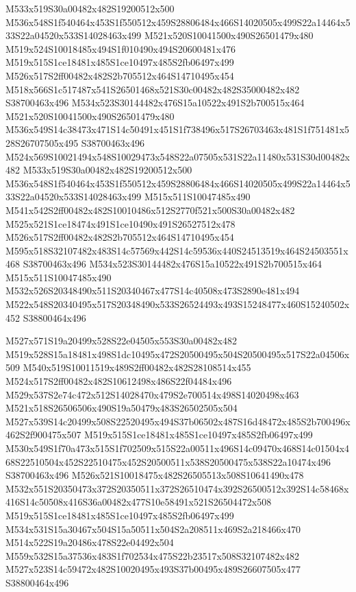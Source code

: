 \documentclass{article}
\begin{document}
\begin{multicols}{2}
M533x519S30a00482x482S19200512x500 M536x548S1f540464x453S1f550512x459S28806484x466S14020505x499S22a14464x533S22a04520x533S14028463x499 M521x520S10041500x490S26501479x480 M519x524S10018485x494S1f010490x494S20600481x476 M519x515S1ce18481x485S1ce10497x485S2fb06497x499 M526x517S2ff00482x482S2b705512x464S14710495x454 M518x566S1c517487x541S26501468x521S30c00482x482S35000482x482 S38700463x496 M534x523S30144482x476S15a10522x491S2b700515x464 M521x520S10041500x490S26501479x480 M536x549S14c38473x471S14c50491x451S1f738496x517S26703463x481S1f751481x528S26707505x495 S38700463x496 M524x569S10021494x548S10029473x548S22a07505x531S22a11480x531S30d00482x482 M533x519S30a00482x482S19200512x500 M536x548S1f540464x453S1f550512x459S28806484x466S14020505x499S22a14464x533S22a04520x533S14028463x499 M515x511S10047485x490 M541x542S2ff00482x482S10010486x512S2770f521x500S30a00482x482 M525x521S1ce18474x491S1ce10490x491S26527512x478 M526x517S2ff00482x482S2b705512x464S14710495x454 M595x518S32107482x483S14c57569x442S14c59536x440S24513519x464S24503551x468 S38700463x496 M534x523S30144482x476S15a10522x491S2b700515x464 M515x511S10047485x490 M532x526S20348490x511S20340467x477S14c40508x473S2890e481x494 M522x548S20340495x517S20348490x533S26524493x493S15248477x460S15240502x452 S38800464x496

M527x571S19a20499x528S22e04505x553S30a00482x482 M519x528S15a18481x498S1dc10495x472S20500495x504S20500495x517S22a04506x509 M540x519S10011519x489S2ff00482x482S28108514x455 M524x517S2ff00482x482S10612498x486S22f04484x496 M529x537S2e74c472x512S14028470x479S2e700514x498S14020498x463 M521x518S26506506x490S19a50479x483S26502505x504 M527x539S14c20499x508S22520495x494S37b06502x487S16d48472x485S2b700496x462S2f900475x507 M519x515S1ce18481x485S1ce10497x485S2fb06497x499 M530x549S1f70a473x515S1f702509x515S22a00511x496S14c09470x468S14c01504x468S22510504x452S22510475x452S20500511x538S20500475x538S22a10474x496 S38700463x496 M526x521S10018475x482S26505513x508S10641490x478 M532x551S20350473x372S20350511x372S26510474x392S26500512x392S14c58468x416S14c50508x416S36a00482x477S10e58491x521S26504472x508 M519x515S1ce18481x485S1ce10497x485S2fb06497x499 M534x531S15a30467x504S15a50511x504S2a208511x469S2a218466x470 M514x522S19a20486x478S22e04492x504 M559x532S15a37536x483S1f702534x475S22b23517x508S32107482x482 M527x523S14c59472x482S10020495x493S37b00495x489S26607505x477 S38800464x496


\end{multicols}
\end{document}
